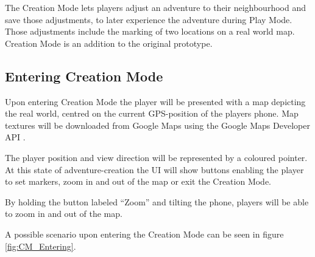 \documentclass{sigchi-ext}
\begin{document}
The Creation Mode lets players adjust an adventure to their neighbourhood and save those adjustments, to later experience the adventure during Play Mode. Those adjustments include the marking of two locations on a real world map. Creation Mode is an addition to the original prototype.

\subsection{Entering Creation Mode}

Upon entering Creation Mode the player will be presented with a map depicting the real world, centred on the current GPS-position of the players phone. Map textures will be downloaded from Google Maps \cite{googlemaps} using the Google Maps Developer API \cite{googlemapsAPI}.

The player position and view direction will be represented by a coloured pointer. At this state of adventure-creation the UI will show buttons enabling the player to set markers, zoom in and out of the map or exit the Creation Mode.

By holding the button labeled ``Zoom'' and tilting the phone, players will be able to zoom in and out of the map.

A possible scenario upon entering the Creation Mode can be seen in figure \ref{fig:CM_Entering}.
\end{document}
